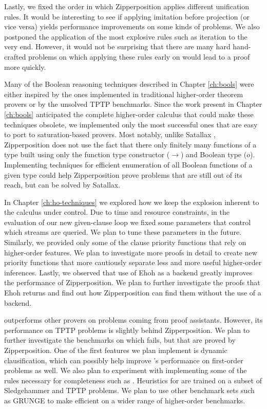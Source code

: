 Lastly, we fixed the order in which Zipperposition applies different unification
rules. It would be interesting to see if applying imitation before projection
(or vice versa) yields performance improvements on some kinds of problems. 
We also postponed the application of the most explosive rules such as iteration
to the very end. However, it would not be surprising that there are many hard hand-crafted
problems on which applying these rules early on would lead to a proof more quickly.

 Many of the Boolean reasoning
techniques described in Chapter \ref{ch:bools} were either inspired by the ones
implemented in traditional higher-order theorem provers or by the unsolved TPTP
benchmarks. Since the work present in Chapter \ref{ch:bools} anticipated the
complete higher-order calculus that could make these techniques obsolete, we
implemented only the most successful ones that are easy to port to
saturation-based provers.  Most notably, unlike Satallax
\cite{cb-2013-satallax}, Zipperposition does not use the fact that there only
finitely many functions of a type built using only the function type constructor
($\rightarrow$) and Boolean type ($o$). Implementing techniques for efficient
enumeration of all Boolean functions of a given type could help Zipperposition
prove problems that are still out of its reach, but can be solved by Satallax.

In Chapter \ref{ch:ho-techniques} we explored how we keep the explosion inherent
to the \osup{} calculus under control. Due to time and resource
constraints, in the evaluation of our new given-clause loop we fixed some
parameters that control which streams are queried. We plan to tune these
parameters in the future.  Similarly, we provided only some of the clause
priority functions that rely on higher-order features. We plan to investigate
more proofs in detail to create new priority functions that more cautiously
separate less and more useful higher-order inferences. Lastly, we observed that
use of Ehoh as a backend greatly improves the performance of Zipperposition. We
plan to further investigate the proofs that Ehoh returns and find out how
Zipperposition can find them without the use of a backend.

 \ehohii{} outperforms other provers on
problems coming from proof assistants. However, its performance on TPTP problems is
slightly behind Zipperposition. We plan to further investigate the benchmarks on
which \ehohii{} fails, but that are proved by Zipperposition. One of the first
features we plan implement is dynamic clausification, which can possibly help
improve \ehohii{}'s performance on first-order problems as well. We also plan to
experiment with implementing some of the \osup{} rules necessary for
completeness such as . Heuristics for \ehohii{} are trained on
a subset of Sledgehammer and TPTP problems. We plan to use other benchmark sets
such as GRUNGE \cite{bgksu-19-grunge} to make \ehohii{} efficient on a wider range of higher-order
benchmarks.

